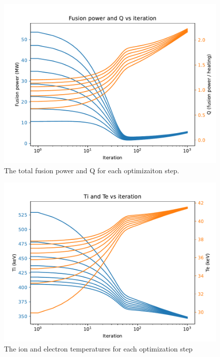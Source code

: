 \begin{figure}
    \centering
    \includegraphics[scale=0.6]{opt_figures/Power_Q_vs_iteration_paper.pdf}
    \caption[Simple mirror: fusion power and Q for each step]{The total fusion power and Q for each optimizaiton step.}
    \label{fig:simple_Q_power}
\end{figure}

\begin{figure}
    \centering
    \includegraphics[scale=0.6]{opt_figures/Ti_Te_vs_iteration_paper.pdf}
    \caption[Simple mirror: temperatures for each step]{The ion and electron temperatures for each optimization step}
    \label{fig:simple_Q_temps}
\end{figure}

